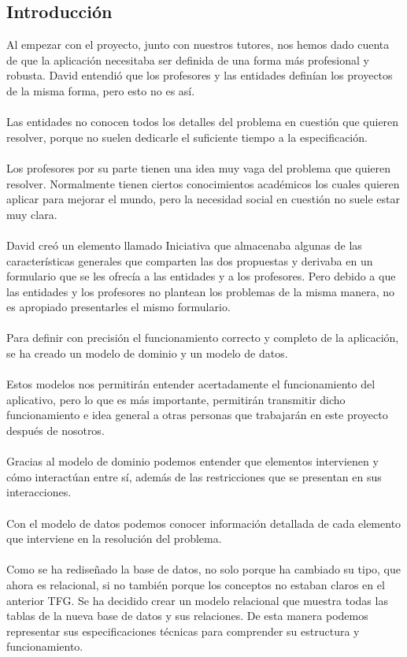 \documentclass[11pt]{article}
\begin{document}
\subsection{Introducción}
Al empezar con el proyecto, junto con nuestros tutores, nos hemos dado cuenta de que la aplicación necesitaba ser definida de una forma más profesional y robusta. David entendió que los profesores y las entidades definían los proyectos de la misma forma, pero esto no es así.\\\\
Las entidades no conocen todos los detalles del problema en cuestión que quieren resolver, porque no suelen dedicarle el suficiente tiempo a la especificación.\\\\
Los profesores por su parte tienen una idea muy vaga del problema que quieren resolver. Normalmente tienen ciertos conocimientos académicos los cuales quieren aplicar para mejorar el mundo, pero la necesidad social en cuestión no suele estar muy clara.\\\\
David creó un elemento llamado Iniciativa que almacenaba algunas de las características generales que comparten las dos propuestas y derivaba en un formulario que se les ofrecía a las entidades y a los profesores. Pero debido a que las entidades y los profesores no plantean los problemas de la misma manera, no es apropiado presentarles el mismo formulario.\\\\
Para definir con precisión el funcionamiento correcto y completo de la aplicación, se ha creado un modelo de dominio y un modelo de datos.\\\\
Estos modelos nos permitirán entender acertadamente el funcionamiento del aplicativo, pero lo que es más importante, permitirán transmitir dicho funcionamiento e idea general a otras personas que trabajarán en este proyecto después de nosotros.\\\\
Gracias al modelo de dominio podemos entender que elementos intervienen y cómo interactúan entre sí, además de las restricciones que se presentan en sus interacciones.\\\\
Con el modelo de datos podemos conocer información detallada de cada elemento que interviene en la resolución del problema.\\\\
Como se ha rediseñado la base de datos, no solo porque ha cambiado su tipo, que ahora es relacional, si no también porque los conceptos no estaban claros en el anterior TFG. Se ha decidido crear un modelo relacional que muestra todas las tablas de la nueva base de datos y sus relaciones. De esta manera podemos representar sus especificaciones técnicas para comprender su estructura y funcionamiento. 
\end{document}
